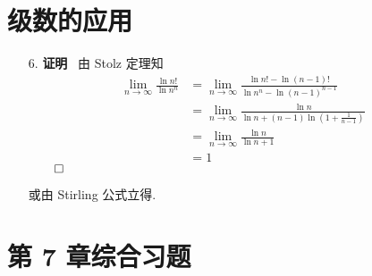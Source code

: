 \documentclass[11pt,oneside,fontset=fandol]{ctexbook} %
\begin{document}
\section{级数的应用}

\begin{enumerate}
    \item[6.]
    \textbf{证明} \ 由 Stolz 定理知
    \begin{align*}
        \lim_{n \to \infty} \frac{\ln n!}{\ln n^n} &= \lim_{n \to \infty} \frac{\ln n! - \ln (n-1)!}{\ln n^n - \ln (n-1)^{n-1}} \\
        &= \lim_{n \to \infty} \frac{\ln n}{\ln n + (n-1) \ln\left( 1 + \frac 1 {n-1} \right)} \\
        &= \lim_{n \to \infty} \frac{\ln n}{\ln n + 1} \\
        &= 1
    \end{align*}
    $\hfill\qed$

    或由 Stirling 公式立得.
\end{enumerate}

\section*{第 7 章综合习题}
\end{document}
